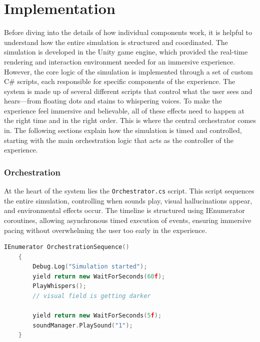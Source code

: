 \chapter{Implementation}
\label{ch:implementation}


Before diving into the details of how individual components work, it is helpful to understand how the entire simulation is structured and coordinated. The simulation is developed in the Unity game engine, which provided the real-time rendering and interaction environment needed for an immersive experience. However, the core logic of the simulation is implemented through a set of custom C\# scripts, each responsible for specific components of the experience. The system is made up of several different scripts that control what the user sees and hears—from floating dots and stains to whispering voices. To make the experience feel immersive and believable, all of these effects need to happen at the right time and in the right order. This is where the central orchestrator comes in. The following sections explain how the simulation is timed and controlled, starting with the main orchestration logic that acts as the controller of the experience.

\subsection{Orchestration}
At the heart of the system lies the \texttt{Orchestrator.cs} script. This script sequences the entire simulation, controlling when sounds play, visual hallucinations appear, and environmental effects occur. The timeline is structured using IEnumerator coroutines, allowing asynchronous timed execution of events, ensuring immersive pacing without overwhelming the user too early in the experience.

\begin{lstlisting}[language=C++, caption={Orchestration Coroutine}, label={lst:orchestration}]
    IEnumerator OrchestrationSequence()
    {
        Debug.Log("Simulation started");
        yield return new WaitForSeconds(60f);
        PlayWhispers();
        // visual field is getting darker
    
        yield return new WaitForSeconds(5f);
        soundManager.PlaySound("1");
    }
    \end{lstlisting}
    

